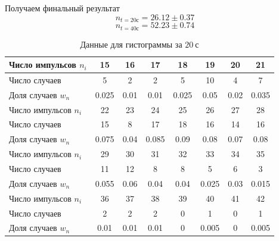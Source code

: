 \documentclass[a4paper, 12pt]{article}
\begin{document}
    
    Получаем финальный результат
    \[n_{t=20с}=26.12 \pm 0.37\]
    \[n_{t=40с}=52.23 \pm 0.74\]



    \begin{table}[!ht]
    	\centering
    	\begin{tabular}{|l|c|c|c|c|c|c|c|}
    		\hline
    		Число импульсов $n_i$ &  15   &  16  &  17   &  18   &  19   &  20  &  21   \\ \hline
    		Число случаев         &   5   &  2   &   2   &   5   &  10   &  4   &   7   \\ \hline
    		Доля случаев $w_n$    & 0.025 & 0.01 & 0.01  & 0.025 & 0.05  & 0.02 & 0.035 \\ \hline\hline
    		Число импульсов $n_i$ &  22   &  23  &  24   &  25   &  26   &  27  &  28   \\ \hline
    		Число случаев         &  15   &  8   &  17   &  18   &  16   &  14  &  16   \\ \hline
    		Доля случаев $w_n$    & 0.075 & 0.04 & 0.085 & 0.09  & 0.08  & 0.07 & 0.08  \\ \hline\hline
    		Число импульсов $n_i$ &  29   &  30  &  31   &  32   &  33   &  34  &  35   \\ \hline
    		Число случаев         &  11   &  12  &   8   &   8   &   5   &  6   &   3   \\ \hline
    		Доля случаев $w_n$    & 0.055 & 0.06 & 0.04  & 0.04  & 0.025 & 0.03 & 0.015 \\ \hline\hline
    		Число импульсов $n_i$ &  36   &  37  &  38   &  39   &  40   &  41  &  42   \\ \hline
    		Число случаев         &   2   &  2   &   2   &   0   &   1   &  0   &   1   \\ \hline
    		Доля случаев $w_n$    & 0.01  & 0.01 & 0.01  &   0   & 0.005 &  0   & 0.005 \\ \hline
    	\end{tabular}
    	\caption{Данные для гистограммы за $20 \ с$}
    	\label{gist20 }
    \end{table}
    \newpage
\end{document}
